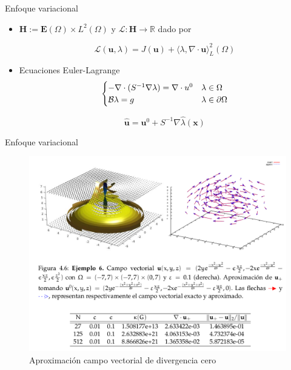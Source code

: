 \documentclass[aspectratio=1610]{beamer}
\begin{document}
\begin{frame}{Enfoque variacional}

  \begin{itemize}
  \item $\mathbf{H}:= \mathbf{E}(\Omega) \times L^2(\Omega)$ y $\mathcal{L}:\mathbf{H}\to \mathbb{R}$ dado por
    
    \begin{displaymath}
      \mathcal{L}(\mathbf{u},\lambda)= J(\mathbf{u}) + \langle \lambda, \nabla \cdot \mathbf{u}\rangle_L^2(\Omega)      
    \end{displaymath}

  \item Ecuaciones Euler-Lagrange
    \begin{displaymath}
      \begin{cases}
        -\nabla \cdot (S^{-1} \nabla \lambda) = \nabla \cdot \mathnormal{u}^0  & \lambda \in \Omega \\
        \mathcal{B} \lambda = g & \lambda \in \partial \Omega  
      \end{cases}
    \end{displaymath}
    
    \begin{displaymath}
      \hat{\mathbf{u}} = \mathbf{u}^0 + S^{-1} \nabla \hat{\lambda}(\mathbf{x})
    \end{displaymath}
  \end{itemize}
  
\end{frame}


\begin{frame}{Enfoque variacional}
    \begin{figure}[h]
    \centering
    \includegraphics[scale=0.3]{fig9}
    \caption{Aproximaci\'on campo vectorial de divergencia cero }
  \end{figure}

\end{frame}
\end{document}
